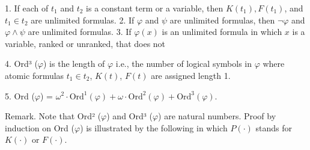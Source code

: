 1. If each of $t_1$ and $t_2$ is a constant term or a variable, then $K(t_1), F(t_1)$, and $t_1 \in t_2$ are unlimited formulas.
2. If $\varphi$ and $\psi$ are unlimited formulas, then $\neg \varphi$ and $\varphi \wedge \psi$ are unlimited formulas.
3. If $\varphi(x)$ is an unlimited formula in which $x$ is a variable, ranked or unranked, that does not

4. Ord³ ($\varphi$) is the length of $\varphi$ i.e., the number of logical symbols in $\varphi$ where atomic formulas $t_1 \in t_2$, $K(t)$, $F(t)$ are assigned length 1.

5. Ord ($\varphi$) = $\omega^2 \cdot \text{Ord}^1 (\varphi) + \omega \cdot \text{Ord}^2 (\varphi) + \text{Ord}^3 (\varphi)$.

Remark. Note that Ord² ($\varphi$) and Ord³ ($\varphi$) are natural numbers. Proof by induction on Ord ($\varphi$) is illustrated by the following in which $P(\cdot)$ stands for $K(\cdot)$ or $F(\cdot)$.
